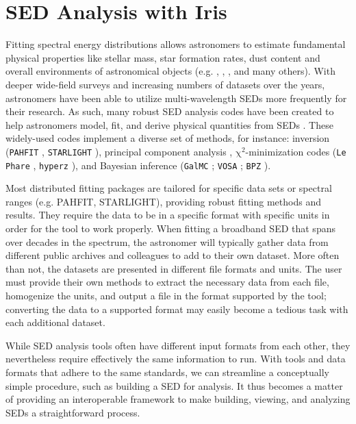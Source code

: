 \documentclass[5p]{elsarticle}
\begin{document}
\section{SED Analysis with Iris}
\label{sec:overview}

Fitting spectral energy distributions allows astronomers to estimate fundamental physical properties like stellar mass, star formation rates, dust content and overall environments of astronomical objects (e.g. \citep{1998AJ....115.1329S}, \citep{2001ApJS..137..139S}, \citep{2007ApJS..169..328R}, and many others). With deeper wide-field surveys and increasing numbers of datasets over the years, astronomers have been able to utilize multi-wavelength SEDs more frequently for their research. As such, many robust SED analysis codes have been created to help astronomers model, fit, and derive physical quantities from SEDs \citep{2011Ap&SS.331....1W,2013ARA&A..51..393C}. These widely-used codes implement a diverse set of methods, for instance: inversion (\texttt{PAHFIT} \citep{2007ApJ...656..770S}, \texttt{STARLIGHT} \cite{2004MNRAS.355..273C}), principal component analysis \citep{2009MNRAS.394.1496B}, $\mathrm{\chi}^{2}$-minimization codes (\texttt{Le Phare} \citep{1999MNRAS.310..540A}, \texttt{hyperz} \citep{2000A&A...363..476B}), and Bayesian inference (\texttt{GalMC} \citep{2011ApJ...737...47A}; \texttt{VOSA} \citep{2008A&A...492..277B}; \texttt{BPZ} \citep{2000ApJ...536..571B}).

Most distributed fitting packages are tailored for specific data sets or spectral ranges (e.g. PAHFIT, STARLIGHT), providing robust fitting methods and results. They require the data to be in a specific format with specific units in order for the tool to work properly. When fitting a broadband SED that spans over decades in the spectrum, the astronomer will typically gather data from different public archives and colleagues to add to their own dataset. More often than not, the datasets are presented in different file formats and units. 
The user must provide their own methods to extract the necessary data from each file, homogenize the units, and output a file in the format supported by the tool; converting the data to a supported format may easily become a tedious task with each additional dataset.

While SED analysis tools often have different input formats from each other, they nevertheless require effectively the same information to run. With tools and data formats that adhere to the same standards, we can streamline a conceptually simple procedure, such as building a SED for analysis. It thus becomes a matter of providing an interoperable framework to make building, viewing, and analyzing SEDs a straightforward process.
\end{document}
